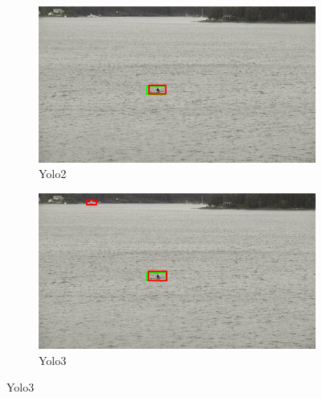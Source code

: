 \begin{figure}[h!]
\begin{subfigure}{.5\textwidth}
  \centering
  \includegraphics[width=0.9\linewidth]{results/case_buildings/yolo23/2better/yolo2/selected_08_07_frame13537.jpg}
  \caption{Yolo2}
\end{subfigure}%
\begin{subfigure}{.5\textwidth}
  \centering
  \includegraphics[width=.9\linewidth]{results/case_buildings/yolo23/2better/yolo3/selected_08_07_frame13537.jpg}
  \caption{Yolo3}
\end{subfigure}


\end{figure}
